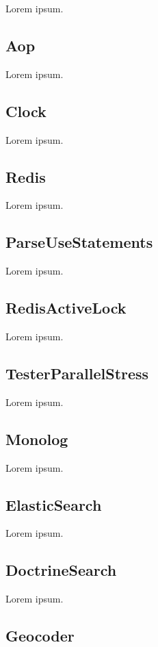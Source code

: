 Lorem ipsum.

\subsection{Aop}

Lorem ipsum.

\subsection{Clock}

Lorem ipsum.

\subsection{Redis}

Lorem ipsum.

\subsection{ParseUseStatements}

Lorem ipsum.

\subsection{RedisActiveLock}

Lorem ipsum.

\subsection{TesterParallelStress}

Lorem ipsum.

\subsection{Monolog}

Lorem ipsum.

\subsection{ElasticSearch}

Lorem ipsum.

\subsection{DoctrineSearch}

Lorem ipsum.

\subsection{Geocoder}

